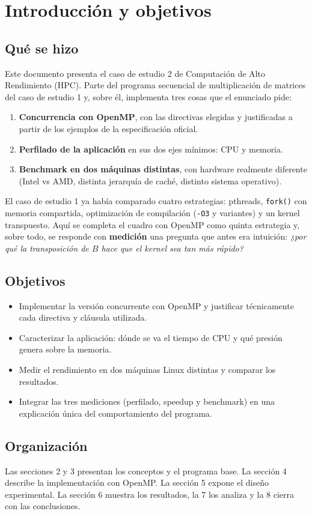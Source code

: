 \section{Introducción y objetivos}

\subsection*{Qué se hizo}

Este documento presenta el caso de estudio 2 de Computación de Alto Rendimiento (HPC). Parte del programa secuencial de multiplicación de matrices del caso de estudio 1 y, sobre él, implementa tres cosas que el enunciado pide:

\begin{enumerate}
    \item \textbf{Concurrencia con OpenMP}, con las directivas elegidas y justificadas a partir de los ejemplos de la especificación oficial.
    \item \textbf{Perfilado de la aplicación} en sus dos ejes mínimos: CPU y memoria.
    \item \textbf{Benchmark en dos máquinas distintas}, con hardware realmente diferente (Intel vs AMD, distinta jerarquía de caché, distinto sistema operativo).
\end{enumerate}

El caso de estudio 1 ya había comparado cuatro estrategias: pthreads, \texttt{fork()} con memoria compartida, optimización de compilación (\texttt{-O3} y variantes) y un kernel transpuesto. Aquí se completa el cuadro con OpenMP como quinta estrategia y, sobre todo, se responde con \textbf{medición} una pregunta que antes era intuición: \textit{¿por qué la transposición de $B$ hace que el kernel sea tan más rápido?}

\subsection*{Objetivos}

\begin{itemize}
    \item Implementar la versión concurrente con OpenMP y justificar técnicamente cada directiva y cláusula utilizada.
    \item Caracterizar la aplicación: dónde se va el tiempo de CPU y qué presión genera sobre la memoria.
    \item Medir el rendimiento en dos máquinas Linux distintas y comparar los resultados.
    \item Integrar las tres mediciones (perfilado, speedup y benchmark) en una explicación única del comportamiento del programa.
\end{itemize}

\subsection*{Organización}

Las secciones 2 y 3 presentan los conceptos y el programa base. La sección 4 describe la implementación con OpenMP. La sección 5 expone el diseño experimental. La sección 6 muestra los resultados, la 7 los analiza y la 8 cierra con las conclusiones.
